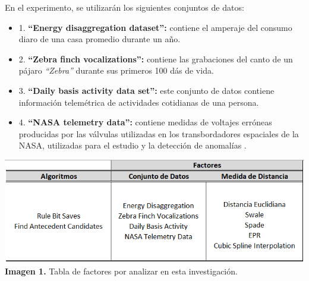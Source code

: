 \begin{itemize}
En el experimento, se utilizar\'an los siguientes conjuntos de datos:
\begin{itemize}
\item 1. \textbf{\enquote{Energy disaggregation dataset}:} contiene el amperaje del consumo diaro de una casa promedio durante un a\~no.
\item 2. \textbf{\enquote{Zebra finch vocalizations}:} contiene las grabaciones del canto de un p\'ajaro \textit{\enquote{Zebra}} durante sus primeros 100 d\'as de vida.
\item 3. \textbf{\enquote{Daily basis activity data set}:} este conjunto de datos contiene informaci\'on telem\'etrica de actividades cotidianas de una persona.
\item 4. \textbf{\enquote{NASA telemetry data}:} contiene medidas de voltajes err\'oneas producidas por las v\'alvulas utilizadas en los transbordadores espaciales de la NASA, utilizadas para el estudio y la detecci\'on de anomal\'ias .
\end{itemize}
\end{itemize}
\begin{center}
\includegraphics[scale=0.7]{factors.png}\\
\vspace*{10pt}
\footnotesize{\textbf{Imagen 1.} Tabla de factores por analizar en esta investigaci\'on.}
\end{center}
